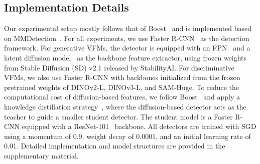 \subsection{Implementation Details}


Our experimental setup mostly follows that of Boost~\cite{ he2025boosting} and is implemented based on MMDetection~\cite{chen2019mmdetection}. For all experiments, we use Faster R-CNN~\cite{ren2016faster} as the detection framework. For generative VFMs, the detector is equipped with an FPN~\cite{lin2017feature} and a latent diffusion model~\cite{rombach2021highresolution} as the backbone feature extractor, using frozen weights from Stable Diffusion (SD) v2.1 released by StabilityAI. For discriminative VFMs, we also use Faster R-CNN with backbones initialized from the frozen pretrained weights of DINOv2-L, DINOv3-L, and SAM-Huge. To reduce the computational cost of diffusion-based features, we follow Boost~\cite{he2025boosting} and apply a knowledge distillation strategy~\cite{wang2024crosskd}, where the diffusion-based detector acts as the teacher to guide a smaller student detector. The student model is a Faster R-CNN equipped with a ResNet-101~\cite{he2016deep} backbone. All detectors are trained with SGD using a momentum of 0.9, weight decay of 0.0001, and an initial learning rate of 0.01. Detailed implementation and model structures are provided in the supplementary material.





